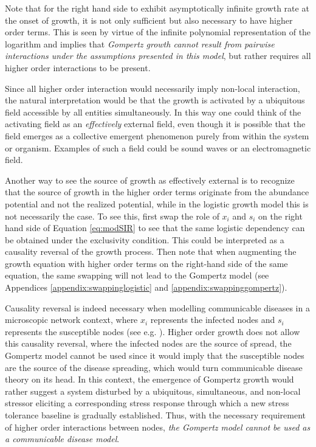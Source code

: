\documentclass{article}
\begin{document}
Note that for the right hand side to exhibit asymptotically infinite growth rate at the onset of growth, it is not only sufficient but also necessary to have higher order terms. This is seen by virtue of the infinite polynomial representation of the logarithm and implies that \textit{Gompertz growth cannot result from pairwise interactions under the assumptions presented in this model}, but rather requires all higher order interactions to be present.

Since all higher order interaction would necessarily imply non-local interaction, the natural interpretation would be that the growth is activated by a ubiquitous field accessible by all entities simultaneously. 
In this way one could think of the activating field as an \textit{effectively} external field, even though it is possible that the field emerges as a collective emergent phenomenon purely from within the system or organism. Examples of such a field could be sound waves or an electromagnetic field.

Another way to see the source of growth as effectively external is to recognize that the source of growth in the higher order terms originate from the abundance potential and not the realized potential, while in the logistic growth model this is not necessarily the case. 
To see this, first swap the role of $x_i$ and $s_i$ on the right hand side of Equation \ref{eq:modSIR} to see that the same logistic dependency can be obtained under the exclusivity condition. This could be interpreted as a causality reversal of the growth process.
Then note that when augmenting the growth equation with higher order terms on the right-hand side of the same equation, the same swapping will not lead to the Gompertz model (see Appendices \ref{appendix:swappinglogistic} and \ref{appendix:swappinggompertz}). 

Causality reversal is indeed necessary when modelling communicable diseases in a microscopic network context, where $x_i$ represents the infected nodes and $s_i$ represents the susceptible nodes (see e.g. \citet{estrada2022networked}). Higher order growth does not allow this causality reversal, where the infected nodes are the source of spread, the Gompertz model cannot be used since it would imply that the susceptible nodes are the source of the disease spreading, which would turn communicable disease theory on its head. In this context, the emergence of Gompertz growth would rather suggest a system disturbed by a ubiquitous, simultaneous, and non-local stressor eliciting a corresponding stress response through which a new stress tolerance baseline is gradually established. Thus, with the necessary requirement of higher order interactions between nodes, \textit{the Gompertz model cannot be used as a communicable disease model}.
\end{document}
